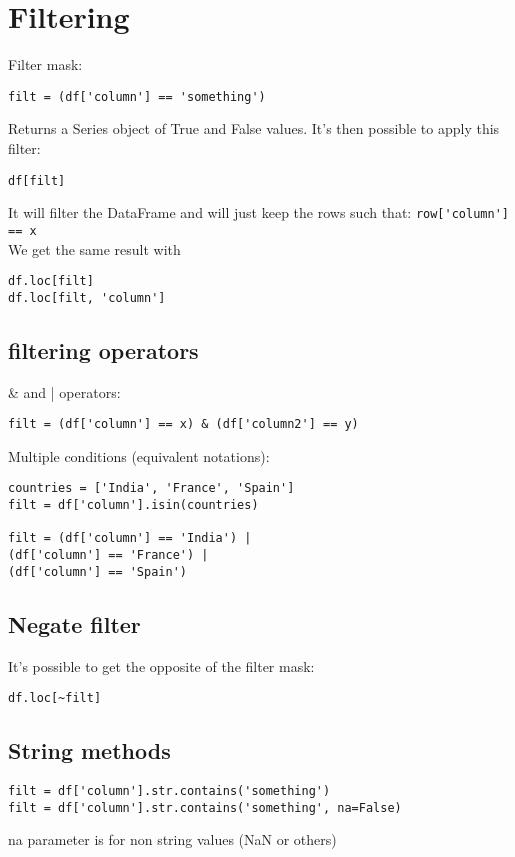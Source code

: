 \documentclass[french]{article}
\begin{document}
\section{Filtering}

Filter mask:
\begin{verbatim}
filt = (df['column'] == 'something')
\end{verbatim}
Returns a Series object of True and False values. It's then possible to apply this filter:
\begin{verbatim}
df[filt]
\end{verbatim}
It will filter the DataFrame and will just keep the rows such that: \verb|row['column'] == x|\\
We get the same result with
\begin{verbatim}
df.loc[filt]
df.loc[filt, 'column']
\end{verbatim}

\subsection{filtering operators}

\& and | operators:
\begin{verbatim}
filt = (df['column'] == x) & (df['column2'] == y)
\end{verbatim}

Multiple conditions (equivalent notations):
\begin{verbatim}
countries = ['India', 'France', 'Spain']
filt = df['column'].isin(countries)

filt = (df['column'] == 'India') |
(df['column'] == 'France') |
(df['column'] == 'Spain')
\end{verbatim}

\subsection{Negate filter}
It's possible to get the opposite of the filter mask:
\begin{verbatim}
df.loc[~filt]
\end{verbatim}

\subsection{String methods}

\begin{verbatim}
filt = df['column'].str.contains('something')
filt = df['column'].str.contains('something', na=False)
\end{verbatim}
na parameter is for non string values (NaN or others)
\end{document}
